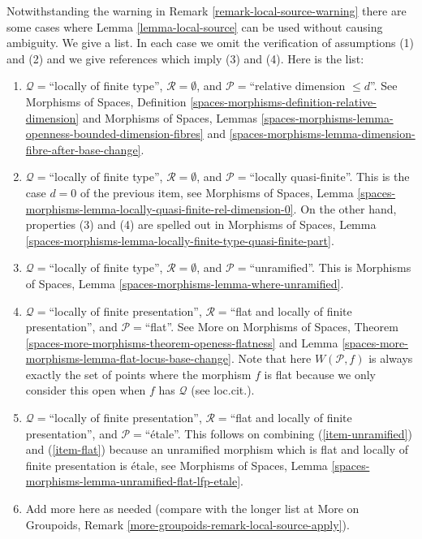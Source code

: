 \begin{remark}
\label{remark-local-source-apply}
Notwithstanding the warning in
Remark \ref{remark-local-source-warning}
there are some cases where
Lemma \ref{lemma-local-source}
can be used without causing ambiguity.
We give a list. In each case we omit the verification of
assumptions (1) and (2) and we give references which imply
(3) and (4). Here is the list:
\begin{enumerate}
\item
\label{item-rel-dim-leq-d}
$\mathcal{Q} = $``locally of finite type'', $\mathcal{R} = \emptyset$,
and $\mathcal{P} =$``relative dimension $\leq d$''.
See
Morphisms of Spaces,
Definition \ref{spaces-morphisms-definition-relative-dimension}
and
Morphisms of Spaces, Lemmas
\ref{spaces-morphisms-lemma-openness-bounded-dimension-fibres} and
\ref{spaces-morphisms-lemma-dimension-fibre-after-base-change}.
\item
\label{item-loc-quasi-finite}
$\mathcal{Q} =$``locally of finite type'', $\mathcal{R} = \emptyset$,
and $\mathcal{P} =$``locally quasi-finite''.
This is the case $d = 0$ of the previous item, see
Morphisms of Spaces, Lemma
\ref{spaces-morphisms-lemma-locally-quasi-finite-rel-dimension-0}.
On the other hand, properties (3) and (4) are spelled out in
Morphisms of Spaces, Lemma
\ref{spaces-morphisms-lemma-locally-finite-type-quasi-finite-part}.
\item
\label{item-unramified}
$\mathcal{Q} = $``locally of finite type'', $\mathcal{R} = \emptyset$,
and $\mathcal{P} =$``unramified''. This is
Morphisms of Spaces, Lemma \ref{spaces-morphisms-lemma-where-unramified}.
\item
\label{item-flat}
$\mathcal{Q} =$``locally of finite presentation'',
$\mathcal{R} =$``flat and locally of finite presentation'', and
$\mathcal{P} =$``flat''. See
More on Morphisms of Spaces, Theorem
\ref{spaces-more-morphisms-theorem-openess-flatness} and
Lemma \ref{spaces-more-morphisms-lemma-flat-locus-base-change}.
Note that here $W(\mathcal{P}, f)$ is always exactly the set of points
where the morphism $f$ is flat because we only consider this open
when $f$ has $\mathcal{Q}$ (see loc.cit.).
\item
\label{item-etale}
$\mathcal{Q} =$``locally of finite presentation'',
$\mathcal{R} =$``flat and locally of finite presentation'', and
$\mathcal{P}=$``\'etale''. This follows on combining
(\ref{item-unramified}) and (\ref{item-flat}) because an unramified
morphism which is flat and locally of finite presentation is \'etale, see
Morphisms of Spaces,
Lemma \ref{spaces-morphisms-lemma-unramified-flat-lfp-etale}.
\item Add more here as needed (compare with the longer list at
More on Groupoids, Remark \ref{more-groupoids-remark-local-source-apply}).
\end{enumerate}
\end{remark}











